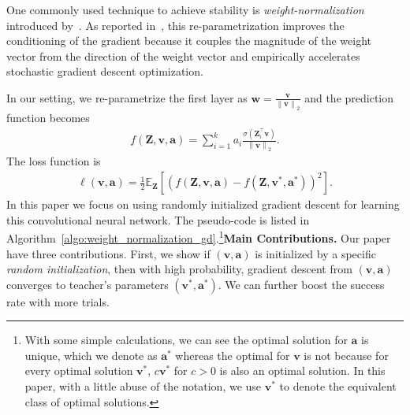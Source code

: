 \documentclass{article}
\newcommand{\firstlayerWN}{v}
\newcommand{\secondlayer}{a}
\def\va{\mathbf{a}}
\def\vv{\mathbf{v}}
\newcommand{\mat}[1]{\mathbf{#1}}
\newcommand{\vect}[1]{\mathbf{#1}}
\newcommand{\norm}[1]{\left\|#1\right\|}
\newcommand{\expect}{\mathbb{E}}
\newcommand{\relu}[1]{\sigma\left(#1\right)}
\begin{document}
One commonly used technique to achieve stability is \emph{weight-normalization} introduced by~\citet{salimans2016weight}.
As reported in~\cite{salimans2016weight}, this re-parametrization improves the conditioning of the gradient  because it couples the magnitude of the weight vector from the direction of the weight vector and empirically accelerates  stochastic gradient descent optimization.



In our setting, we re-parametrize the first layer as $\vect{w} = \frac{\vect{\firstlayerWN}}{\norm{\vect{\firstlayerWN}}_2}$ and the prediction function becomes
\begin{align}
f\left(\mat{Z},\vect{\firstlayerWN},\vect{\secondlayer}\right) = \sum_{i=1}^{k} {\secondlayer}_i \frac{\relu{\mat{Z}_i^\top \vect{\firstlayerWN}}}{\norm{\vect{\firstlayerWN}}_2}. %
\end{align}
The loss function is
\begin{align}
\ell\left(\vect{\vect{\firstlayerWN},\vect{\secondlayer}}\right) = \frac{1}{2}\expect_{\mat{Z}}\left[\left(f\left(\mat{Z},\vect{\firstlayerWN},\vect{\secondlayer}\right) - f\left(\mat{Z},\vect{\firstlayerWN}^*,\vect{\secondlayer}^*\right)\right)^2\right]. \label{eqn:pop_obj_WN}
\end{align}
In this paper we focus on using randomly initialized gradient descent for learning this convolutional neural network.
The pseudo-code is listed in Algorithm~\ref{algo:weight_normalization_gd}.\footnote{With some simple calculations, we can see the optimal solution for $\vect{\secondlayer}$ is unique, which we denote as $\vect{\secondlayer}^*$ whereas the optimal for $\vect{\firstlayerWN}$ is not because for every optimal solution $\vect{\firstlayerWN}^*$, $c\vect{\firstlayerWN}^*$ for $c>0$ is also an optimal solution.
In this paper, with a little abuse of the notation, we use $\vect{\firstlayerWN}^*$ to denote the equivalent class of optimal solutions.
}\textbf{Main Contributions.} Our paper have three contributions. First, we show if $(\vect{\firstlayerWN},\vect{\secondlayer})$ is initialized by a specific \emph{random initialization}, then with high probability,
gradient descent from $(\vect{\firstlayerWN},\vect{\secondlayer})$ converges to teacher's parameters $(\vv^*, \va^*)$. We can further boost the success rate with more trials.
\end{document}
